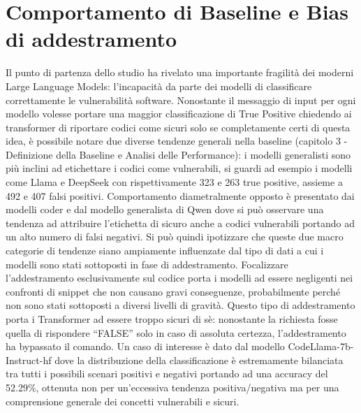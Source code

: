 \section{Comportamento di Baseline e Bias di addestramento}
Il punto di partenza dello studio ha rivelato una importante fragilità dei moderni Large Language Models: l'incapacità da parte dei modelli di classificare correttamente le vulnerabilità software.
Nonostante il messaggio di input per ogni modello volesse portare una maggior classificazione di True Positive chiedendo ai transformer di riportare codici come sicuri solo se completamente certi di questa idea, è possibile notare due diverse tendenze generali nella baseline (capitolo 3 - Definizione della Baseline e Analisi delle Performance): i modelli generalisti sono più inclini ad etichettare i codici come vulnerabili, si guardi ad esempio i modelli come Llama e DeepSeek con rispettivamente 323 e 263 true positive, assieme a 492 e 407 falsi positivi.
Comportamento diametralmente opposto è presentato dai modelli coder e dal modello generalista di Qwen dove si può osservare una tendenza ad attribuire l'etichetta di sicuro anche a codici vulnerabili portando ad un alto numero di falsi negativi.
Si può quindi ipotizzare che queste due macro categorie di tendenze siano ampiamente influenzate dal tipo di dati a cui i modelli sono stati sottoposti in fase di addestramento.
Focalizzare l'addestramento esclusivamente sul codice porta i modelli ad essere negligenti nei confronti di snippet che non causano gravi conseguenze, probabilmente perché non sono stati sottoposti a diversi livelli di gravità.
Questo tipo di addestramento porta i Transformer ad essere troppo sicuri di sè: nonostante la richiesta fosse quella di rispondere \enquote{FALSE} solo in caso di assoluta certezza, l'addestramento ha bypassato il comando.
Un caso di interesse è dato dal modello CodeLlama-7b-Instruct-hf dove la distribuzione della classificazione è estremamente bilanciata tra tutti i possibili scenari positivi e negativi portando ad una accuracy del 52.29\%, ottenuta non per un'eccessiva tendenza positiva/negativa ma per una comprensione generale dei concetti vulnerabili e sicuri.

